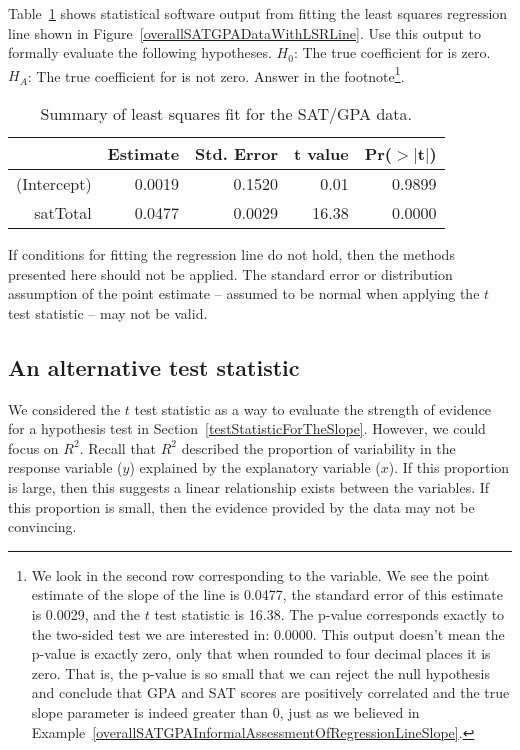 \begin{exercise}
Table~\ref{rOutputForSATGPALSRLineInInferenceSection} shows statistical software output from fitting the least squares regression line shown in Figure~\ref{overallSATGPADataWithLSRLine}. Use this output to formally evaluate the following hypotheses. $H_0$: The true coefficient for  is zero. $H_A$: The true coefficient for  is not zero. Answer in the footnote\footnote{We look in the second row corresponding to the  variable. We see the point estimate of the slope of the line is 0.0477, the standard error of this estimate is 0.0029, and the $t$ test statistic is 16.38. The p-value corresponds exactly to the two-sided test we are interested in: 0.0000. This output doesn't mean the p-value is exactly zero, only that when rounded to four decimal places it is zero. That is, the p-value is so small that we can reject the null hypothesis and conclude that GPA and SAT scores are positively correlated and the true slope parameter is indeed greater than 0, just as we believed in Example~\ref{overallSATGPAInformalAssessmentOfRegressionLineSlope}.}.
\end{exercise}
\begin{table}[ht]
\centering
\begin{tabular}{rrrrr}
  \hline
 & Estimate & Std. Error & t value & Pr($>$$|$t$|$) \\ 
  \hline
(Intercept) & 0.0019 & 0.1520 & 0.01 & 0.9899 \\ 
satTotal & 0.0477 & 0.0029 & 16.38 & 0.0000 \\ 
   \hline
\end{tabular}
\caption{Summary of least squares fit for the SAT/GPA data.}
\label{rOutputForSATGPALSRLineInInferenceSection}
\end{table}

\begin{tipBox}{
If conditions for fitting the regression line do not hold, then the methods presented here should not be applied. The standard error or distribution assumption of the point estimate -- assumed to be normal when applying the $t$ test statistic -- may not be valid.}
\end{tipBox}

\subsection{An alternative test statistic}

We considered the $t$ test statistic as a way to evaluate the strength of evidence for a hypothesis test in Section~\ref{testStatisticForTheSlope}. However, we could focus on $R^2$. Recall that $R^2$ described the proportion of variability in the response variable ($y$) explained by the explanatory variable ($x$). If this proportion is large, then this suggests a linear relationship exists between the variables. If this proportion is small, then the evidence provided by the data may not be convincing.

